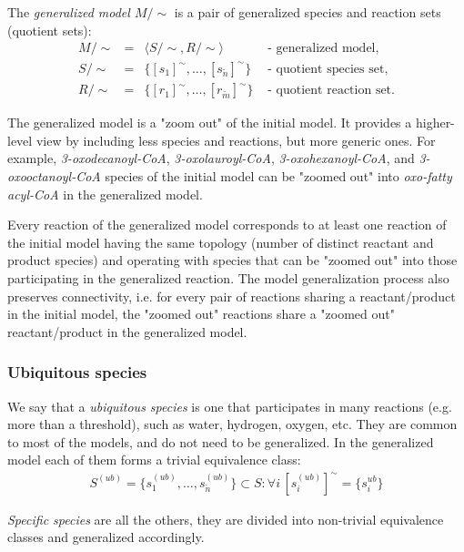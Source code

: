 \documentclass[10pt]{bmc_article}
\newenvironment{bmcformat}{\baselineskip20pt\sloppy\setboolean{publ}{false}}{\baselineskip20pt\sloppy}
\begin{document}
\begin{bmcformat}
The \emph{generalized model $M/\sim$} is a pair of generalized species and reaction sets (quotient sets):
\[ \begin{array}{ccll}
\mbox{$M/\sim$} & \mbox{$=$} & \mbox{$\langle S/\sim, R/\sim \rangle$} & \mbox{ - generalized model,} \\
\mbox{$S/\sim$} & \mbox{$=$} & \mbox{$\{[s_1]^{\sim}, \ldots, [s_{\tilde{n}}]^{\sim}\}$} &  \mbox{ - quotient species set,} \\
\mbox{$R/\sim$} & \mbox{$=$} & \mbox{$\{[r_1]^{\sim}, \ldots, [r_{\tilde{m}}]^{\sim}\}$} &  \mbox{ - quotient reaction set.} 
\end{array} \]

The generalized model is a "zoom out" of the initial model. It provides a higher-level view by including less species and reactions, but more generic ones. For example, \textit{3-oxodecanoyl-CoA}, \textit{3-oxolauroyl-CoA}, \textit{3-oxohexanoyl-CoA}, and \textit{3-oxooctanoyl-CoA} species of the initial model can be "zoomed out" into \textit{oxo-fatty acyl-CoA} in the generalized model. 

Every reaction of the generalized model corresponds to at least one reaction of the initial model having the same topology (number of distinct reactant and product species) and operating with species that can be "zoomed out" into those participating in the generalized reaction. The model generalization process also preserves connectivity, i.e. for every pair of reactions sharing a reactant/product in the initial model, the "zoomed out" reactions share a "zoomed out" reactant/product in the generalized model.


\subsubsection*{Ubiquitous species}

We say that a \emph{ubiquitous species} is one that participates in many reactions (e.g. more than a threshold), such as water, hydrogen, oxygen, etc. They are common to most of the models, and do not need to be generalized. In the generalized model each of them forms a trivial equivalence class:
\[ \begin{array}{l}
\mbox{$S^{(ub)} = \{s^{(ub)}_1, \ldots, s^{(ub)}_{\breve{n}}\} \subset S: \forall i\,[s^{(ub)}_i]^{\sim} = \{s^{ub}_i\}$} 
\end{array} \]

\emph{Specific species} are all the others, they are divided into non-trivial equivalence classes and generalized accordingly.  


\end{bmcformat}
\end{document}
